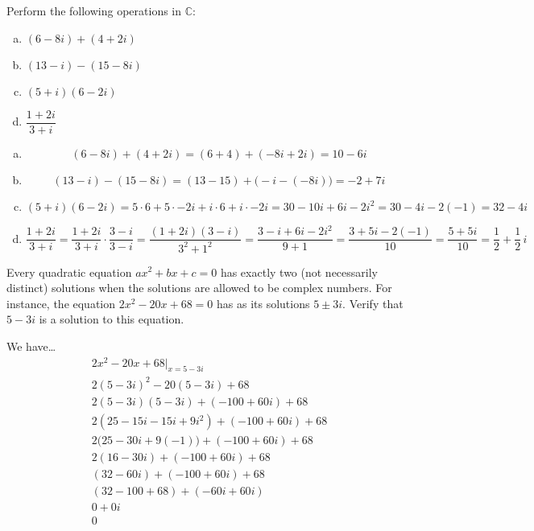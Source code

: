 \documentclass[11pt,letterpaper]{article}
\begin{document}
\newpage



 Perform the following operations in $\mathbb{C}$:
	\begin{enumerate}[(a)]
	\item $(6 - 8i) + (4 + 2i)$
	\item $(13 - i) - (15 - 8i)$
	\item $(5 + i)(6 - 2i)$
	\item $\dfrac{1 + 2i}{3 + i}$
	\end{enumerate} \pspace

\sol 
\begin{enumerate}[(a)]
\item 
	\[
	(6 - 8i) + (4 + 2i)= (6 + 4) + (-8i + 2i)= 10 - 6i
	\] \pspace

\item 
	\[
	(13 - i) - (15 - 8i)= (13 - 15) + \big(-i - (-8i) \big)= -2 + 7i
	\] \pspace

\item 
	\[
	(5 + i)(6 - 2i)= 5 \cdot 6 + 5 \cdot -2i + i \cdot 6 + i \cdot -2i= 30 - 10i + 6i - 2i^2= 30 - 4i - 2(-1)= 32 - 4i
	\] \pspace

\item 
	\[
	\dfrac{1 + 2i}{3 + i}= \dfrac{1 + 2i}{3 + i} \cdot \dfrac{3 - i}{3 - i}= \dfrac{(1 + 2i)(3 - i)}{3^2 + 1^2}= \dfrac{3 - i + 6i - 2i^2}{9 + 1}= \dfrac{3 + 5i - 2(-1)}{10}= \dfrac{5 + 5i}{10}= \frac{1}{2} + \frac{1}{2}\, i
	\]
\end{enumerate}



\newpage



 Every quadratic equation $ax^2 + bx + c= 0$ has exactly two (not necessarily distinct) solutions when the solutions are allowed to be complex numbers. For instance, the equation $2x^2 - 20x + 68= 0$ has as its solutions $5 \pm 3i$. Verify that $5 - 3i$ is a solution to this equation. \pspace

\sol We have\dots
	\[
	\begin{gathered}
	2x^2 - 20x + 68 \bigg|_{x= 5 - 3i} \\[0.3cm]
	2(5 - 3i)^2 - 20(5 - 3i) + 68 \\[0.3cm]
	2(5 - 3i)(5 - 3i) + (-100 + 60i) + 68 \\[0.3cm]
	2(25 - 15i - 15i + 9i^2) + (-100 + 60i) + 68 \\[0.3cm]
	2 \big(25 - 30i + 9(-1) \big) + (-100 + 60i) + 68 \\[0.3cm]
	2 (16 - 30i) + (-100 + 60i) + 68 \\[0.3cm]
	(32 - 60i) + (-100 + 60i) + 68 \\[0.3cm]
	(32 - 100 + 68) + (-60i + 60i) \\[0.3cm]
	0 + 0i \\[0.3cm]
	0
	\end{gathered}
	\]
\end{document}
